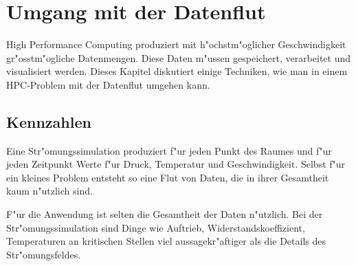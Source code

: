 \chapter{Umgang  mit der Datenflut}
High Performance Computing produziert mit h"ochstm"oglicher Geschwindigkeit
gr"osstm"ogliche Datenmengen. Diese Daten m"ussen gespeichert, verarbeitet
und visualisiert werden.
Dieses Kapitel diskutiert einige Techniken, wie man in einem HPC-Problem
mit der Datenflut umgehen kann.

\section{Kennzahlen}
Eine Str"omungssimulation produziert f"ur jeden Punkt des Raumes und
f"ur jeden Zeitpunkt Werte f"ur Druck, Temperatur und Geschwindigkeit.
Selbst f"ur ein kleines Problem entsteht so eine Flut von Daten, die
in ihrer Gesamtheit kaum n"utzlich sind. 

F"ur die Anwendung ist selten die Gesamtheit der Daten n"utzlich.
Bei der Str"omungssimulation sind Dinge wie Auftrieb, Widerstandskoeffizient,
Temperaturen an kritischen Stellen viel aussagekr"aftiger als die Details
des Str"omungsfeldes. 

